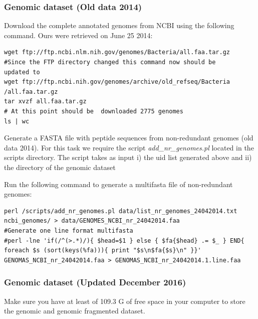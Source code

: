 \documentclass[12pt]{report}
\begin{document}
\subsubsection{Genomic dataset (Old data 2014)}
Download the complete  annotated genomes from NCBI using the following command. Ours were retrieved on June 25 2014:  

\begin{verbatim}
wget ftp://ftp.ncbi.nlm.nih.gov/genomes/Bacteria/all.faa.tar.gz
#Since the FTP directory changed this command now should be 
updated to
wget ftp://ftp.ncbi.nih.gov/genomes/archive/old_refseq/Bacteria
/all.faa.tar.gz
tar xvzf all.faa.tar.gz
# At this point should be  downloaded 2775 genomes
ls | wc 
\end{verbatim}

Generate a FASTA file with peptide sequences from non-redundant genomes (old data 2014). 
For this task we require the script  \textit{add\_nr\_genomes.pl} located in the scripts directory.
The script takes as input i) the uid list generated above and ii) the directory of the genomic dataset 

Run the following command to generate a multifasta file of non-redundant genomes:
\begin{verbatim}
perl /scripts/add_nr_genomes.pl data/list_nr_genomes_24042014.txt 
ncbi_genomes/ > data/GENOMES_NCBI_nr_24042014.faa
#Generate one line format multifasta 
#perl -lne 'if(/^(>.*)/){ $head=$1 } else { $fa{$head} .= $_ } END{ 
foreach $s (sort(keys(%fa))){ print "$s\n$fa{$s}\n" }}' 
GENOMAS_NCBI_nr_24042014.faa > GENOMAS_NCBI_nr_24042014.1.line.faa
\end{verbatim}

\subsubsection{Genomic dataset (Updated December 2016) }

Make sure you have at least of 109.3 G of free space in your computer to store the genomic and genomic fragmented dataset. 
\end{document}

